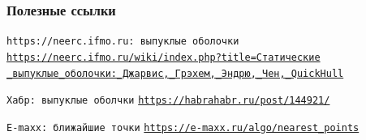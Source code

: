 \documentclass[10pt]{beamer}
\begin{document}
\begin{frame}[allowframebreaks]
  \frametitle<presentation>{Полезные ссылки}
    
  \begin{thebibliography}{10}
{
  \beamertemplatebookbibitems
  \texttt{https://neerc.ifmo.ru: выпуклые оболочки}
  \newblock \href{https://neerc.ifmo.ru/wiki/index.php?title=\%D0\%A1\%D1\%82\%D0\%B0\%D1\%82\%D0\%B8\%D1\%87\%D0\%B5\%D1\%81\%D0\%BA\%D0\%B8\%D0\%B5_\%D0\%B2\%D1\%8B\%D0\%BF\%D1\%83\%D0\%BA\%D0\%BB\%D1\%8B\%D0\%B5_\%D0\%BE\%D0\%B1\%D0\%BE\%D0\%BB\%D0\%BE\%D1\%87\%D0\%BA\%D0\%B8:_\%D0\%94\%D0\%B6\%D0\%B0\%D1\%80\%D0\%B2\%D0\%B8\%D1\%81,_\%D0\%93\%D1\%80\%D1\%8D\%D1\%85\%D0\%B5\%D0\%BC,_\%D0\%AD\%D0\%BD\%D0\%B4\%D1\%80\%D1\%8E,_\%D0\%A7\%D0\%B5\%D0\%BD,_QuickHull}{\texttt{https://neerc.ifmo.ru/wiki/index.php?title=Статические\\ \_выпуклые\_оболочки:\_Джарвис,\_Грэхем,\_Эндрю,\_Чен,\_QuickHull}}
  
  \texttt{Хабр: выпуклые оболчки}
  \newblock \href{https://habrahabr.ru/post/144921/}{\texttt{https://habrahabr.ru/post/144921/}}
  
   \texttt{E-maxx: ближайшие точки}
  \newblock \href{ https://e-maxx.ru/algo/nearest\_points}{\texttt{https://e-maxx.ru/algo/nearest\_points}}
 
}
    
  \end{thebibliography}
\end{frame}
\end{document}
